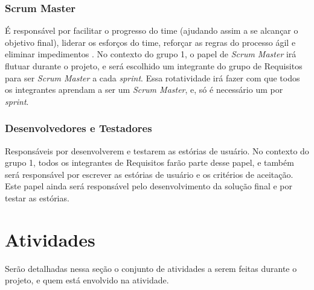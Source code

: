 \subsubsection{Scrum Master}
É responsável por facilitar o progresso do time (ajudando assim a se alcançar o objetivo final), liderar os esforços do time, reforçar as regras do processo ágil e eliminar impedimentos \cite[p. 47-48]{safe001}. No contexto do grupo 1, o papel de \emph{Scrum Master} irá flutuar durante o projeto, e será escolhido um integrante do grupo de Requisitos para ser \emph{Scrum Master} a cada \emph{sprint}. Essa rotatividade irá fazer com que todos os integrantes aprendam a ser um \emph{Scrum Master}, e, só é necessário um por \emph{sprint}.

\subsubsection{Desenvolvedores e Testadores}
Responsáveis por desenvolverem e testarem as estórias de usuário. No contexto do grupo 1, todos os integrantes de Requisitos farão parte desse papel, e também será responsável por escrever as estórias de usuário e os critérios de aceitação. Este papel ainda será responsável pelo desenvolvimento da solução final e por testar as estórias.


\section{Atividades}
Serão detalhadas nessa seção o conjunto de atividades a serem feitas durante o projeto, e quem está envolvido na atividade.


